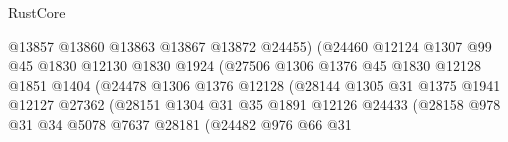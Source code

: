\begin{lexlean}{RustCore}
\begin{coremodule}
                                        @13857
                                        @13860
                                        @13863
                                        @13867
                                        @13872
                                        @24455)
                                      (@24460
                                        @12124
                                        @1307
                                        @99
                                        @45
                                        @1830
                                        @12130
                                        @1830
                                        @1924
                                        (@27506
                                          @1306
                                          @1376
                                          @45
                                          @1830
                                          @12128
                                          @1851
                                          @1404
                                          (@24478
                                            @1306
                                            @1376
                                            @12128
                                            (@28144
                                              @1305
                                              @31
                                              @1375
                                              @1941
                                              @12127
                                              @27362
                                              (@28151
                                                @1304
                                                @31
                                                @35
                                                @1891
                                                @12126
                                                @24433
                                                (@28158
                                                  @978
                                                  @31
                                                  @34
                                                  @5078
                                                  @7637
                                                  @28181
                                                  (@24482
                                                    @976
                                                    @66
                                                    @31

\end{coremodule}
\end{lexlean}
